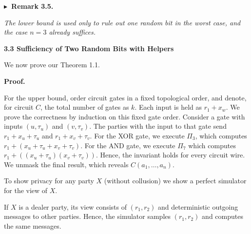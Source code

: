 \documentclass[10pt,a4paper]{article}
\begin{document}


\par\medskip\noindent\textbf{
$\blacktriangleright$ Remark 3.5.
}\par



\emph{The lower bound is used only to rule out one random bit in the worst case, and the case $n=3$ already suffices.}\par








\par\medskip\noindent\textbf{
3.3 Sufficiency of Two Random Bits with Helpers}\par




We now prove our Theorem 1.1.\par




\par\medskip\noindent\textbf{Proof.}\par




For the upper bound, order circuit gates in a fixed topological order, and denote, for circuit $C$, the total number of gates as $k$. Each input is held as $r_{1}+x_{w}$. We prove the correctness by induction on this fixed gate order. Consider a gate with inputs $(u,\tau_{u})$ and $(v,\tau_{v})$. The parties with the input to that gate send $r_{1}+x_{u}+\tau_{u}$ and $r_{1}+x_{v}+\tau_{v}$. For the XOR gate, we execute $\Pi_{3}$, which computes $r_{1}+(x_{u}+\tau_{u}+x_{v}+\tau_{v})$. For the AND gate, we execute $\Pi_{7}$ which computes $r_{1}+((x_{u}+\tau_{u})(x_{v}+\tau_{v}))$. Hence, the invariant holds for every circuit wire. We unmask the final result, which reveals $C(a_{1},\dots,a_{n})$.\par




To show privacy for any party $X$ (without collusion) we show a perfect simulator for the view of $X$.\par




If $X$ is a dealer party, its view consists of $(r_{1},r_{2})$ and deterministic outgoing messages to other parties. Hence, the simulator samples $(r_{1},r_{2})$ and computes the same messages.\par
\end{document}
